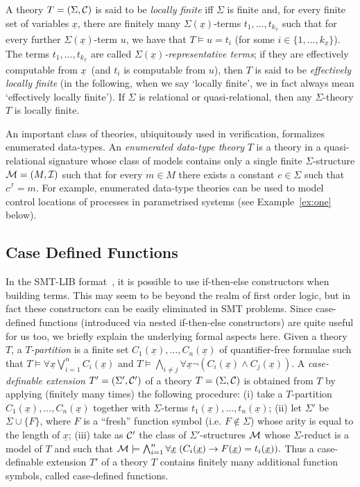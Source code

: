\documentclass{LMCS}
\newcommand{\idx}[2][i]{\ensuremath {#1 \in \{1,\ldots,\mbox{$#2$}\}}}
\newcommand{\ux}{\ensuremath{\underline x}}
\newcommand{\cM}{\ensuremath \mathcal M}
\newcommand{\Cc}{\ensuremath \mathcal C}
\theoremstyle{plain}\newtheorem{assumption}[thm]{Assumption}
\theoremstyle{plain}\newtheorem{proposition}[thm]{Proposition}
\theoremstyle{plain}\newtheorem{property}[thm]{Property}
\theoremstyle{plain}\newtheorem{example}[thm]{Example}
\theoremstyle{plain}\newtheorem{claim}[thm]{Claim}
\theoremstyle{plain}\newtheorem{lemma}[thm]{Lemma}
\begin{document}
A theory $T=({\Sigma}, \Cc)$ is said to be \emph{locally finite} iff
$\Sigma$ is finite and, for every finite set of variables \ux, there
are finitely many $\Sigma(\ux)$-terms $t_1, \dots, t_{k_{\ux}}$ such
that for every further $\Sigma({\ux})$-term $u$, we have that $T
\models u = t_i$ (for some \idx{k_{\ux}}). The terms $t_1, \dots,
t_{k_{\ux}}$ are called \emph{$\Sigma(\ux)$-representative terms}; if
they are effectively computable from \ux\ (and $t_i$ is computable
from $u$), then $T$ is said to be \emph{effectively locally finite}
(in the following, when we say `locally finite', we in fact always
mean `effectively locally finite').  If $\Sigma$ is relational or
quasi-relational, then any $\Sigma$-theory $T$ is locally finite.

An important class of theories, ubiquitously used in verification,
formalizes enumerated data-types.  An \emph{enumerated data-type
  theory} $T$ is a theory in a quasi-relational signature whose class
of models contains only a single finite $\Sigma$-structure $\cM = (M,
\mathcal I )$ such that for every $m \in M$ there exists a constant $c
\in \Sigma$ such that $c^{\mathcal I} = m$.  For example, enumerated
data-type theories can be used to model control locations of processes
in parametrised systems (see Example~\ref{ex:one} below).


\subsection{Case Defined Functions}
\label{subsec:case-def}
In the SMT-LIB format~\cite{smtlib}, it is possible to use
if-then-else constructors when building terms. This may seem to be
beyond the realm of first order logic, but in fact these constructors
can be easily eliminated in SMT problems. Since case-defined functions
(introduced via nested if-then-else constructors) are quite useful for
us too, we briefly explain the underlying formal aspects here. Given a
theory $T$,
a \emph{$T$-partition} is a finite set $C_1(\ux), \dots, C_n(\ux)$ of
quantifier-free formulae such that $T\models \forall \ux
\bigvee_{i=1}^n C_i(\ux)$ and $T\models \bigwedge_{i\not=j}\forall \ux
\neg (C_i(\ux)\wedge C_j(\ux))$.  A \emph{case-definable extension}
$T'=(\Sigma', \Cc')$ of a theory $T=(\Sigma, \Cc)$ is obtained from
$T$ by applying (finitely many times) the following procedure: (i)
take a $T$-partition $C_1(\ux), \dots, C_n(\ux)$ together with
$\Sigma$-terms $t_1(\ux), \dots, t_n(\ux)$; (ii) let $\Sigma'$ be
$\Sigma\cup\{F\}$, where $F$ is a ``fresh'' function symbol
(i.e. $F\not\in\Sigma$) whose arity is equal to the length of $\ux$;
(iii) take as $\Cc'$ the class of $\Sigma'$-structures $\cM$ whose
$\Sigma$-reduct is a model of $T$ and such that $\cM \models
\bigwedge_{i=1}^n \forall\ux\; (C_i(\ux) \to F(\ux) = t_i(\ux)).$ Thus
a case-definable extension $T'$ of a theory $T$ contains finitely many
additional function symbols, called case-defined functions.
\end{document}

